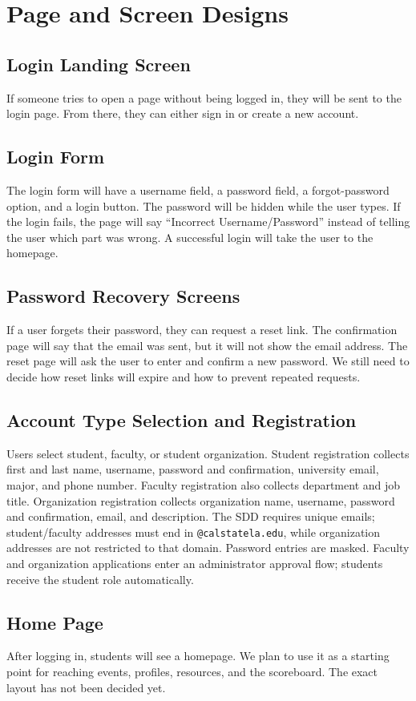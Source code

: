 \documentclass[11pt,letterpaper]{article}
\begin{document}
\section{Page and Screen Designs}
\subsection{Login Landing Screen}
If someone tries to open a page without being logged in, they will be sent to the login page. From there, they can either sign in or create a new account.
\subsection{Login Form}
The login form will have a username field, a password field, a forgot-password option, and a login button. The password will be hidden while the user types. If the login fails, the page will say ``Incorrect Username/Password'' instead of telling the user which part was wrong. A successful login will take the user to the homepage.
\subsection{Password Recovery Screens}
If a user forgets their password, they can request a reset link. The confirmation page will say that the email was sent, but it will not show the email address. The reset page will ask the user to enter and confirm a new password. We still need to decide how reset links will expire and how to prevent repeated requests.
\subsection{Account Type Selection and Registration}
Users select student, faculty, or student organization. Student registration collects first and last name, username, password and confirmation, university email, major, and phone number. Faculty registration also collects department and job title. Organization registration collects organization name, username, password and confirmation, email, and description. The SDD requires unique emails; student/faculty addresses must end in \texttt{@calstatela.edu}, while organization addresses are not restricted to that domain. Password entries are masked. Faculty and organization applications enter an administrator approval flow; students receive the student role automatically.
\subsection{Home Page}
After logging in, students will see a homepage. We plan to use it as a starting point for reaching events, profiles, resources, and the scoreboard. The exact layout has not been decided yet.
\end{document}
